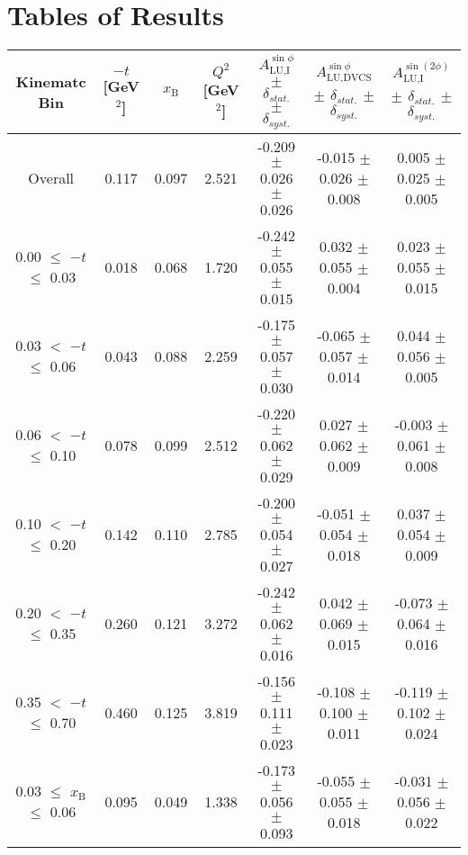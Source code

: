 \appendix
\appendixpage
\addappheadtotoc
\setcounter{equation}{0}

\section{Tables of Results}


\begin{table}[width=15cm]
 \begin{center}
\resizebox{16cm}{!} {
  \begin{tabular}{|c|c|c|c|c|c|c|}
\hline
Kinematc Bin &  $-t$ [GeV$^{2}$] & $x_{\textrm{B}}$ & $Q^{2}$ [GeV$^{2}$] & 
$A_{\textrm{LU,I}}^{\sin\phi}$ $\pm$ $\delta_{stat.}$ $\pm$ $\delta_{syst.}$ & $A_{\textrm{LU,DVCS}}^{\sin\phi}$ $\pm$ $\delta_{stat.}$ $\pm$ $\delta_{syst.}$
& $A_{\textrm{LU,I}}^{\sin(2\phi)}$ $\pm$ $\delta_{stat.}$ $\pm$ $\delta_{syst.}$ \\
\hline
\hline
Overall &  0.117 & 0.097 &  2.521 &  -0.209  $\pm$  0.026  $\pm$   0.026 &
 -0.015  $\pm$  0.026  $\pm$  0.008 & 0.005  $\pm$  0.025  $\pm$   0.005 \\
\hline
0.00 $\leqslant$ $-t$ $\leqslant$ 0.03 &  0.018 & 0.068 &  1.720 &  -0.242  $\pm$  0.055  $\pm$   0.015 &
 0.032  $\pm$  0.055   $\pm$  0.004 & 0.023  $\pm$  0.055  $\pm$   0.015\\
0.03 $<$ $-t$ $\leqslant$ 0.06 &  0.043 & 0.088 &  2.259&  -0.175 $\pm$   0.057   $\pm$  0.030 &
 -0.065 $\pm$   0.057  $\pm$   0.014 & 0.044  $\pm$  0.056  $\pm$   0.005\\
0.06 $<$ $-t$ $\leqslant$ 0.10 &  0.078 & 0.099 &  2.512 & -0.220 $\pm$   0.062   $\pm$  0.029 &
 0.027  $\pm$  0.062  $\pm$   0.009 & -0.003  $\pm$  0.061   $\pm$  0.008 \\
0.10 $<$ $-t$ $\leqslant$ 0.20 &  0.142 & 0.110 &  2.785 &  -0.200 $\pm$   0.054  $\pm$   0.027 &
-0.051  $\pm$  0.054  $\pm$   0.018 & 0.037  $\pm$  0.054  $\pm$  0.009\\
0.20 $<$ $-t$ $\leqslant$ 0.35 &  0.260 & 0.121 &  3.272 &  -0.242 $\pm$   0.062  $\pm$   0.016 &
0.042  $\pm$  0.069  $\pm$   0.015 & -0.073 $\pm$   0.064   $\pm$  0.016\\
0.35 $<$ $-t$ $\leqslant$ 0.70 &  0.460 & 0.125 &  3.819 &  -0.156  $\pm$  0.111  $\pm$   0.023 & 
-0.108  $\pm$  0.100   $\pm$  0.011 & -0.119 $\pm$   0.102  $\pm$   0.024\\
\hline
0.03 $\leqslant$ $x_{\textrm{B}}$ $\leqslant$ 0.06 &  0.095 & 0.049 &  1.338 &  -0.173  $\pm$  0.056  $\pm$   0.093 &
-0.055 $\pm$   0.055  $\pm$   0.018 & -0.031  $\pm$  0.056  $\pm$   0.022\\

\end{tabular}}
\end{center}
\end{table}
